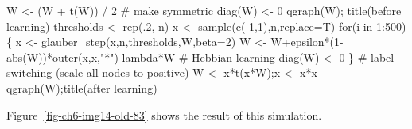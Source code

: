 \documentclass[
  a4paper,
  DIV=11,
  numbers=noendperiod,
  oneside]{scrreprt}
\newenvironment{Shaded}{}{}
\newcommand{\AttributeTok}[1]{\textcolor[rgb]{0.84,0.23,0.29}{#1}}
\newcommand{\CommentTok}[1]{\textcolor[rgb]{0.42,0.45,0.49}{#1}}
\newcommand{\ControlFlowTok}[1]{\textcolor[rgb]{0.84,0.23,0.29}{#1}}
\newcommand{\DecValTok}[1]{\textcolor[rgb]{0.00,0.36,0.77}{#1}}
\newcommand{\FunctionTok}[1]{\textcolor[rgb]{0.44,0.26,0.76}{#1}}
\newcommand{\NormalTok}[1]{\textcolor[rgb]{0.14,0.16,0.18}{#1}}
\newcommand{\OtherTok}[1]{\textcolor[rgb]{0.44,0.26,0.76}{#1}}
\newcommand{\SpecialCharTok}[1]{\textcolor[rgb]{0.00,0.36,0.77}{#1}}
\newcommand{\StringTok}[1]{\textcolor[rgb]{0.01,0.18,0.38}{#1}}
\begin{document}
\begin{Shaded}
\begin{Highlighting}[]
\NormalTok{W }\OtherTok{\textless{}{-}}\NormalTok{ (W }\SpecialCharTok{+} \FunctionTok{t}\NormalTok{(W)) }\SpecialCharTok{/} \DecValTok{2} \CommentTok{\# make symmetric}
\FunctionTok{diag}\NormalTok{(W) }\OtherTok{\textless{}{-}} \DecValTok{0}
\FunctionTok{qgraph}\NormalTok{(W); }\FunctionTok{title}\NormalTok{(}\StringTok{\textquotesingle{}before learning\textquotesingle{}}\NormalTok{)}
\NormalTok{thresholds }\OtherTok{\textless{}{-}} \FunctionTok{rep}\NormalTok{(.}\DecValTok{2}\NormalTok{, n)}
\NormalTok{x }\OtherTok{\textless{}{-}} \FunctionTok{sample}\NormalTok{(}\FunctionTok{c}\NormalTok{(}\SpecialCharTok{{-}}\DecValTok{1}\NormalTok{,}\DecValTok{1}\NormalTok{),n,}\AttributeTok{replace=}\NormalTok{T)}
\ControlFlowTok{for}\NormalTok{(i }\ControlFlowTok{in} \DecValTok{1}\SpecialCharTok{:}\DecValTok{500}\NormalTok{)}
\NormalTok{\{}
\NormalTok{x }\OtherTok{\textless{}{-}} \FunctionTok{glauber\_step}\NormalTok{(x,n,thresholds,W,}\AttributeTok{beta=}\DecValTok{2}\NormalTok{)}
\NormalTok{W }\OtherTok{\textless{}{-}}\NormalTok{ W}\SpecialCharTok{+}\NormalTok{epsilon}\SpecialCharTok{*}\NormalTok{(}\DecValTok{1}\SpecialCharTok{{-}}\FunctionTok{abs}\NormalTok{(W))}\SpecialCharTok{*}\FunctionTok{outer}\NormalTok{(x,x,}\StringTok{"*"}\NormalTok{)}\SpecialCharTok{{-}}\NormalTok{lambda}\SpecialCharTok{*}\NormalTok{W }\CommentTok{\# Hebbian learning}
\FunctionTok{diag}\NormalTok{(W) }\OtherTok{\textless{}{-}} \DecValTok{0}
\NormalTok{\}}
\CommentTok{\# label switching (scale all nodes to positive)}
\NormalTok{W }\OtherTok{\textless{}{-}}\NormalTok{ x}\SpecialCharTok{*}\FunctionTok{t}\NormalTok{(x}\SpecialCharTok{*}\NormalTok{W);x }\OtherTok{\textless{}{-}}\NormalTok{ x}\SpecialCharTok{*}\NormalTok{x}
\FunctionTok{qgraph}\NormalTok{(W);}\FunctionTok{title}\NormalTok{(}\StringTok{\textquotesingle{}after learning\textquotesingle{}}\NormalTok{)}
\end{Highlighting}
\end{Shaded}

Figure~\ref{fig-ch6-img14-old-83} shows the result of this simulation.
\end{document}
